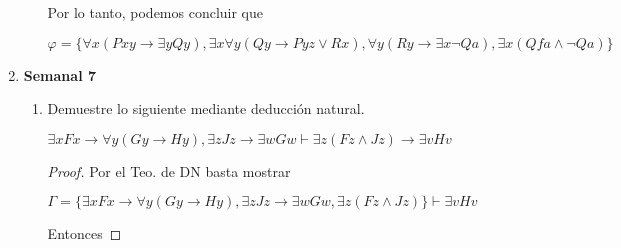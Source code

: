 \documentclass[letterpaper,12pt]{article}
\begin{document}
\begin{enumerate}
\begin{enumerate}
        Por lo tanto, podemos concluir que 
        
        \begin{center}
            $\varphi = \{\forall x (Pxy \rightarrow \exists y Qy), 
            \exists x \forall y (Qy \rightarrow Pyz \lor Rx),
            \forall y (Ry \rightarrow \exists x \neg Qa),
            \exists x (Qfa \land \neg Qa)\}$
        \end{center}
    \end{enumerate}

    \item \textbf{Semanal 7}
    
    \begin{enumerate}
        \item Demuestre lo siguiente mediante deducción natural.
        
        \begin{center}
            $\exists x Fx \rightarrow \forall y (Gy \rightarrow Hy),
            \exists z Jz \rightarrow \exists w Gw 
            \vdash \exists z (Fz \land Jz) \rightarrow \exists v Hv$
        \end{center}
        \begin{proof}
            Por el Teo. de DN basta mostrar

            \begin{center}
                $\Gamma = \{ \exists x Fx \rightarrow 
                \forall y(Gy \rightarrow Hy), \exists z Jz \rightarrow 
                \exists w Gw, \exists z(Fz \land Jz) \} \vdash\exists v Hv$
            \end{center}
            
            Entonces
            

\end{proof}
\end{enumerate}
\end{enumerate}
\end{document}
